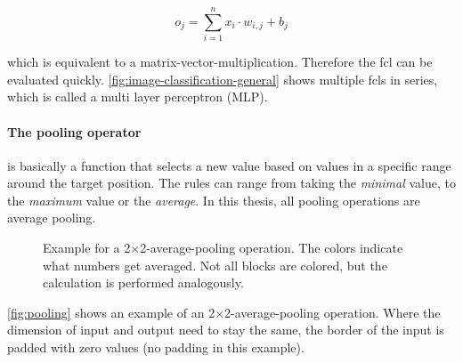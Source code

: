 \begin{equation}
    \label{eq:fcl} 
    o_j = \sum\limits_{i=1}^{n} x_i\cdot w_{i, j} + b_j
\end{equation}

which is equivalent to a matrix-vector-multiplication. Therefore the fcl can be evaluated quickly.
\autoref{fig:image-classification-general} shows multiple fcls in series, which is called a multi layer perceptron (MLP). 

\paragraph{The pooling operator} is basically a function that selects a new value based on values in a specific range around the target position.
The rules can range from taking the \emph{minimal} value, to the \emph{maximum} value or the \emph{average}.
In this thesis, all pooling operations are average pooling.
\begin{figure}[htbp]
    \centering
    \vspace{-0.2cm}
    \caption{
        Example for a 2$\times$2-average-pooling operation. The colors indicate what numbers get averaged. 
        Not all blocks are colored, but the calculation is performed analogously.
    }
    \label{fig:pooling}
\end{figure}
\autoref{fig:pooling} shows an example of an 2$\times$2-average-pooling operation.
Where the dimension of input and output need to stay the same, the border of the input is padded with zero values (no padding in this example).